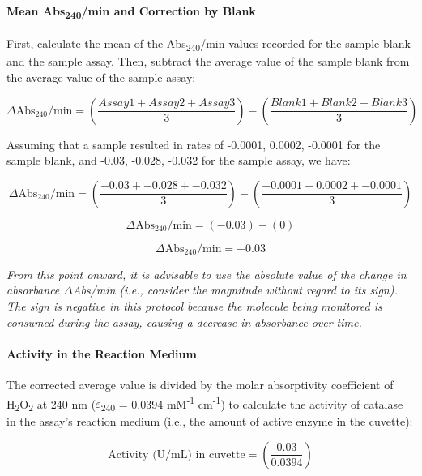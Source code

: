 \documentclass[
  9pt,
  american,
  a5paper,
  extrafontsizes,onecolumn,openright
  ]{memoir}
\begin{document}
\paragraph{\texorpdfstring{Mean Abs\textsubscript{240}/min and Correction by Blank}{Mean Abs240/min and Correction by Blank}}\label{mean-abs240min-and-correction-by-blank}

First, calculate the mean of the Abs\textsubscript{240}/min values recorded for the sample blank and the sample assay. Then, subtract the average value of the sample blank from the average value of the sample assay:

\[ \Delta \text{Abs}_{240}/\text{min} = \left( \frac{Assay 1 + Assay 2 + Assay 3}{3} \right) - \left( \frac{Blank 1 + Blank 2 + Blank 3}{3} \right)
\]

Assuming that a sample resulted in rates of -0.0001, 0.0002, -0.0001 for the sample blank, and -0.03, -0.028, -0.032 for the sample assay, we have:

\[ \Delta \text{Abs}_{240}/\text{min} = \left( \frac{-0.03 + -0.028 + -0.032}{3} \right) - \left( \frac{-0.0001 + 0.0002 + -0.0001}{3} \right)\]

\[ \Delta \text{Abs}_{240}/\text{min} = (-0.03) - (0)
\]

\[ \Delta \text{Abs}_{240}/\text{min} = -0.03
\]

\begin{greybox}[frametitle = Note]
\emph{From this point onward, it is advisable to use the absolute value of the change in absorbance ΔAbs/min (i.e., consider the magnitude without regard to its sign). The sign is negative in this protocol because the molecule being monitored is consumed during the assay, causing a decrease in absorbance over time.}

\end{greybox}

\paragraph{Activity in the Reaction Medium}\label{activity-in-the-reaction-medium}

The corrected average value is divided by the molar absorptivity coefficient of H\textsubscript{2}O\textsubscript{2} at 240 nm (\(\varepsilon\)\textsubscript{240} = 0.0394 mM\textsuperscript{-1} cm\textsuperscript{-1}) to calculate the activity of catalase in the assay's reaction medium (i.e., the amount of active enzyme in the cuvette):

\[ \text{Activity (U/mL) in cuvette} = \left( \frac{0.03}{0.0394} \right) \]
\end{document}
